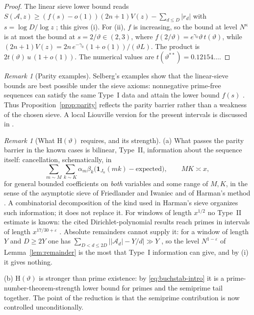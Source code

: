 \documentclass[11pt]{article}
\theoremstyle{remark}
\newtheorem{remark}[theorem]{Remark}
\newcommand{\N}{N}
\newcommand{\J}{J_n}
\newcommand{\A}{\mathcal{A}}
\newcommand{\thstar}{\vartheta^{**}}
\begin{document}
\begin{proof}
The linear sieve lower bound reads
$S(\A,z)\ge (f(s)-o(1))(2n+1)V(z)-\sum_{d\le D}|r_d|$ with $s=\log D/\log z$
\cite{FriedlanderIwaniec}; this gives (i). For (ii), $f$ is increasing, so the bound
at level $\N^{\kappa}$ is at most the bound at $s=2/\vartheta\in(2,3)$, where
$f(2/\vartheta)=e^{\gamma_0}\vartheta\,t(\vartheta)$, while
$(2n+1)V(z)=2n\,e^{-\gamma_0}(1+o(1))/(\vartheta L)$. The product is
$2t(\vartheta)\,u\,(1+o(1))$. The numerical values are $t(\thstar)=0.12154\ldots$.
\end{proof}

\begin{remark}[Parity examples]\label{rem:twist}
Selberg's examples show that the linear-sieve bounds are best possible under the sieve axioms: nonnegative prime-free sequences can satisfy the same Type~I data and attain the lower bound $f(s)$ \cite{Selberg,FriedlanderIwaniec}. Thus Proposition~\ref{prop:parity} reflects the parity barrier rather than a weakness of the chosen sieve. A local Liouville version for the present intervals is discussed in \cite[\S\S12--14]{RossShells}.
\end{remark}

\begin{remark}[What $\mathrm{H}(\vartheta)$ requires, and its strength]\label{rem:requires}
(a) What passes the parity barrier in the known cases is bilinear, Type~II,
information about the sequence itself: cancellation, schematically, in
\[
\sum_{m\sim M}\sum_{k\sim K}\alpha_m\beta_k\bigl(\mathbf{1}_{\J}(mk)-\text{expected}\bigr),
\qquad MK\asymp x,
\]
for general bounded coefficients on \emph{both} variables and some range of $M,K$,
in the sense of the asymptotic sieve of Friedlander and Iwaniec \cite{FI98} and of
Harman's method \cite{Harman,FordMaynard}. A combinatorial decomposition of the kind
used in Harman's sieve organizes such information; it does not replace it. For
windows of length $x^{1/2}$ no Type~II estimate is known: the cited
Dirichlet-polynomial results reach primes in intervals of length
$x^{17/30+\varepsilon}$ \cite{GuthMaynard}. Absolute remainders cannot supply it: for a window
of length $Y$ and $D\ge 2Y$ one has $\sum_{D<d\le 2D}\bigl||\A_d|-Y/d\bigr|\gg Y$
\cite[\S14]{RossShells}, so the level $\N^{1-\varepsilon}$ of
Lemma~\ref{lem:remainder} is the most that Type~I information can give, and by (i) it
gives nothing.

(b) $\mathrm{H}(\vartheta)$ is stronger than prime existence: by \eqref{eq:buchstab-intro} it is a prime-number-theorem-strength lower bound for primes and the semiprime tail together. The point of the reduction is that the semiprime contribution is now controlled unconditionally.
\end{remark}
\end{document}
